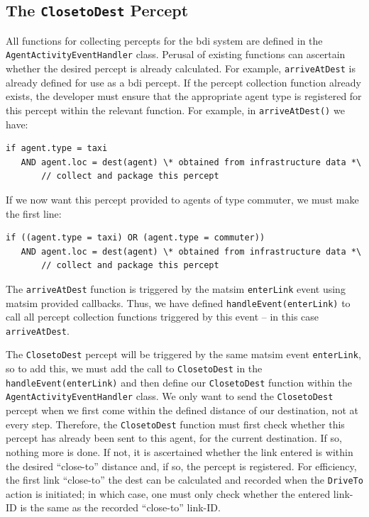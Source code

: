 \subsection{The \lstinline{ClosetoDest} Percept}
All functions for collecting percepts for the \gls{bdi} system are defined
in the \lstinline{AgentActivityEventHandler} class. Perusal of existing
functions can ascertain whether the desired percept is already
calculated. For example, \lstinline{arriveAtDest} is already defined for use as a
\gls{bdi} percept. 
%
If the percept collection function already exists, 
the developer must ensure that the appropriate agent type is
registered for this percept within the relevant function.
For example, in \lstinline{arriveAtDest()} we have:
\begin{lstlisting}
if agent.type = taxi
   AND agent.loc = dest(agent) \* obtained from infrastructure data *\
       // collect and package this percept
\end{lstlisting}
If we now want this percept provided to agents of type commuter, we
must make the first line:
\begin{lstlisting}
if ((agent.type = taxi) OR (agent.type = commuter))
   AND agent.loc = dest(agent) \* obtained from infrastructure data *\
       // collect and package this percept
\end{lstlisting}

The \lstinline{arriveAtDest} function is triggered by the \gls{matsim}
\lstinline{enterLink} event using \gls{matsim} provided callbacks. Thus,
we have defined \lstinline{handleEvent(enterLink)} to call all percept
  collection functions triggered by this event -- in this case
  \lstinline{arriveAtDest}. 

The \lstinline{ClosetoDest} percept will be triggered by the same \gls{matsim}
event \lstinline{enterLink}, so to add this, we must add the call to
\lstinline{ClosetoDest} in the \lstinline{handleEvent(enterLink)} and then
  define our \lstinline{ClosetoDest} function within the
  \lstinline{AgentActivityEventHandler} class.  We only want to send the
  \lstinline{ClosetoDest} percept when we first come within the defined
  distance of our destination, not at every step. Therefore, the
  \lstinline{ClosetoDest} function must first check whether this percept
  has already been sent to this agent, for the current destination. If
  so, nothing more is done. If not, it is ascertained whether the link
  entered is within the desired ``close-to'' distance and, if so, the
  percept is registered. For efficiency, the first link 
 ``close-to'' the dest can be calculated and recorded when the
    \lstinline{DriveTo} action is initiated; in which case, one must only
   check whether the entered link-ID is the same as the recorded
    ``close-to'' link-ID.


